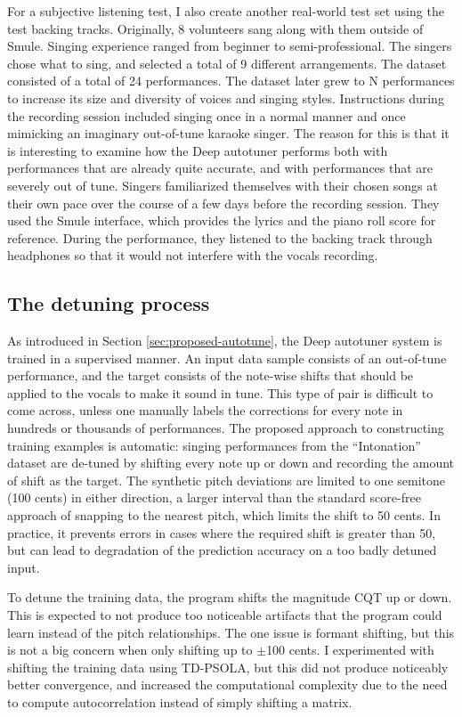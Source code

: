 For a subjective listening test, I also create another real-world test set using the test backing tracks. Originally, 8 volunteers sang along with them outside of Smule. Singing experience ranged from beginner to semi-professional. The singers chose what to sing, and selected a total of 9 different arrangements. The dataset consisted of a total of 24 performances. The dataset later grew to N performances to increase its size and diversity of voices and singing styles. Instructions during the recording session included singing once in a normal manner and once mimicking an imaginary out-of-tune karaoke singer. The reason for this is that it is interesting to examine how the Deep autotuner performs both with performances that are already quite accurate, and with performances that are severely out of tune. Singers familiarized themselves with their chosen songs at their own pace over the course of a few days before the recording session. They used the Smule interface, which provides the lyrics and the piano roll score for reference. During the performance, they listened to the backing track through headphones so that it would not interfere with the vocals recording.

\subsection{The detuning process}
As introduced in Section \ref{sec:proposed-autotune}, the Deep autotuner system is trained in a supervised manner. An input data sample consists of an out-of-tune performance, and the target consists of the note-wise shifts that should be applied to the vocals to make it sound in tune. This type of pair is difficult to come across, unless one manually labels the corrections for every note in hundreds or thousands of performances. The proposed approach to constructing training examples is automatic: singing performances from the ``Intonation'' dataset are de-tuned by shifting every note up or down and recording the amount of shift as the target. The synthetic pitch deviations are limited to one semitone (100 cents) in either direction, a larger interval than the standard score-free approach of snapping to the nearest pitch, which limits the shift to 50 cents. In practice, it prevents errors in cases where the required shift is greater than 50, but can lead to degradation of the prediction accuracy on a too badly detuned input. 

To detune the training data, the program shifts the magnitude CQT up or down. This is expected to not produce too noticeable artifacts that the program could learn instead of the pitch relationships. The one issue is formant shifting, but this is not a big concern when only shifting up to $\pm$100 cents. I experimented with shifting the training data using TD-PSOLA, but this did not produce noticeably better convergence, and increased the computational complexity due to the need to compute autocorrelation instead of simply shifting a matrix. 

